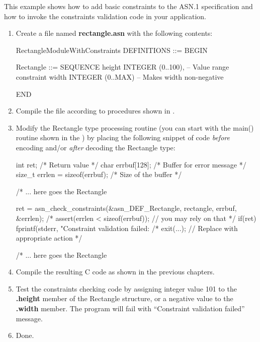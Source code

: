 \documentclass[english,oneside,12pt]{book}
\begin{document}
This example shows how to add basic constraints to the ASN.1 specification
and how to invoke the constraints validation code in your application.
\begin{enumerate}

\item Create a file named \textbf{rectangle.asn} with the following contents:

\begin{asn}
RectangleModuleWithConstraints DEFINITIONS ::= BEGIN

Rectangle ::= SEQUENCE {
    height  INTEGER (0..100), -- Value range constraint
    width   INTEGER (0..MAX)  -- Makes width non-negative 
}

END
\end{asn}

\item Compile the file according to procedures shown in .
\item Modify the Rectangle type processing routine (you can start with the
main() routine shown in the )
by placing the following snippet of code \emph{before} encoding and/or
\emph{after} decoding the Rectangle type:

\begin{codesample}[basicstyle=\scriptsize\listingfont]
int ret;           /* Return value */
char errbuf[128];  /* Buffer for error message */
size_t errlen = sizeof(errbuf);  /* Size of the buffer */

/* ... here goes the Rectangle %

ret = asn_check_constraints(&asn_DEF_Rectangle, rectangle, errbuf, &errlen);
/* assert(errlen < sizeof(errbuf)); // you may rely on that */
if(ret) {
    fprintf(stderr, "Constraint validation failed: %
    /* exit(...); // Replace with appropriate action */
 }

/* ... here goes the Rectangle %
\end{codesample}
\item Compile the resulting C code as shown in the previous chapters.
\item Test the constraints checking code by assigning integer value
101 to the \textbf{.height} member of the Rectangle structure, or
a negative value to the \textbf{.width} member.
The program will fail with ``Constraint validation failed'' message.
\item Done.
\end{enumerate}
\end{document}
